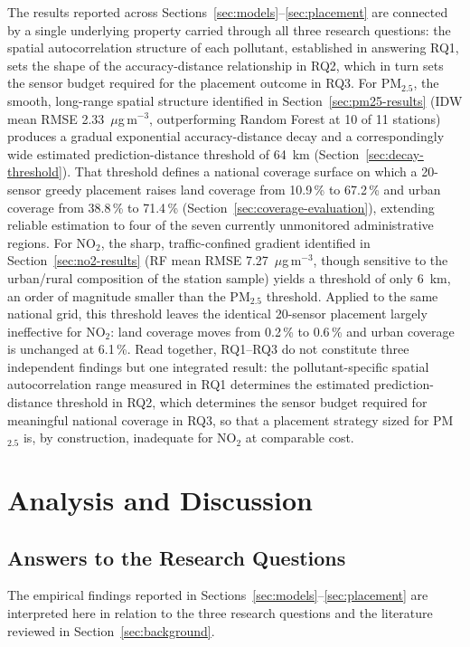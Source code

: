 \documentclass[11pt,a4paper]{article}
\let\oldsection\section
\renewcommand{\section}{\FloatBarrier\oldsection}
\let\oldsubsection\subsection
\renewcommand{\subsection}{\FloatBarrier\oldsubsection}
\begin{document}
The results reported across Sections~\ref{sec:models}--\ref{sec:placement} are connected by a single underlying property carried through all three research questions: the spatial autocorrelation structure of each pollutant, established in answering RQ1, sets the shape of the accuracy-distance relationship in RQ2, which in turn sets the sensor budget required for the placement outcome in RQ3. For PM$_{2.5}$, the smooth, long-range spatial structure identified in Section~\ref{sec:pm25-results} (IDW mean RMSE 2.33~$\mu$g\,m$^{-3}$, outperforming Random Forest at 10 of 11 stations) produces a gradual exponential accuracy-distance decay and a correspondingly wide estimated prediction-distance threshold of 64~km (Section~\ref{sec:decay-threshold}). That threshold defines a national coverage surface on which a 20-sensor greedy placement raises land coverage from 10.9\,\% to 67.2\,\% and urban coverage from 38.8\,\% to 71.4\,\% (Section~\ref{sec:coverage-evaluation}), extending reliable estimation to four of the seven currently unmonitored administrative regions. For NO$_2$, the sharp, traffic-confined gradient identified in Section~\ref{sec:no2-results} (RF mean RMSE 7.27~$\mu$g\,m$^{-3}$, though sensitive to the urban/rural composition of the station sample) yields a threshold of only 6~km, an order of magnitude smaller than the PM$_{2.5}$ threshold. Applied to the same national grid, this threshold leaves the identical 20-sensor placement largely ineffective for NO$_2$: land coverage moves from 0.2\,\% to 0.6\,\% and urban coverage is unchanged at 6.1\,\%. Read together, RQ1--RQ3 do not constitute three independent findings but one integrated result: the pollutant-specific spatial autocorrelation range measured in RQ1 determines the estimated prediction-distance threshold in RQ2, which determines the sensor budget required for meaningful national coverage in RQ3, so that a placement strategy sized for PM$_{2.5}$ is, by construction, inadequate for NO$_2$ at comparable cost.

\section{Analysis and Discussion}
\label{sec:discussion}

\subsection{Answers to the Research Questions}
\label{sec:discussion-rq}

The empirical findings reported in Sections~\ref{sec:models}--\ref{sec:placement} are interpreted here in relation to the three research questions and the literature reviewed in Section~\ref{sec:background}.
\end{document}
